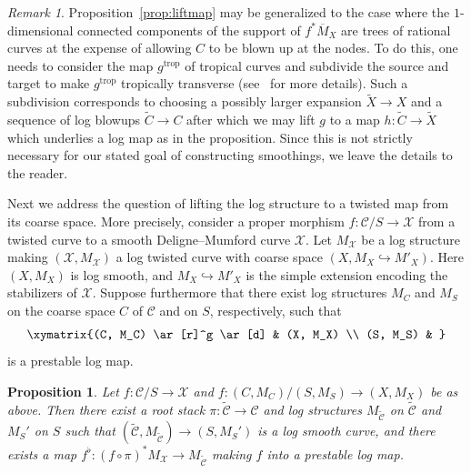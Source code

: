 \documentclass[11pt]{amsart}
\numberwithin{equation}{section}
\newtheorem{proposition}[theorem]{Proposition}
\theoremstyle{definition}
\theoremstyle{remark}
\newtheorem{remark}[theorem]{Remark}
\newcommand{\calX}{\mathcal X}
\newcommand{\calC}{\mathcal C}
\newcommand{\trop}{\mathrm{trop}}
\begin{document}
\begin{remark} \label{rem:f*M} Proposition~\ref{prop:liftmap} may be generalized to the case where the $1$-dimensional connected components of the support of $f^*\overline{M}_X$ are trees of rational curves at the expense of allowing $C$ to be blown up at the nodes. To do this, one needs to consider the map $g^{\trop}$ of tropical curves and subdivide the source and target to make $g^{\trop}$ tropically transverse (see~\cite[Sections 2.5 and 2.6]{dhruv} for more details). Such a subdivision corresponds to choosing a possibly larger expansion $\widetilde{X} \to X$ and a sequence of log blowups $\widetilde{C} \to C$ after which we may lift $g$ to a map $h \colon  \widetilde{C} \to \widetilde{X}$ which underlies a log map as in the proposition. Since this is not strictly necessary for our stated goal of constructing smoothings, we leave the details to the reader. 
\end{remark} 


Next we address the question of lifting the log structure to a twisted map from its coarse space. More precisely, consider a proper morphism $f \colon  \calC/S \to \calX$  from a twisted curve to a smooth Deligne--Mumford curve $\calX$. Let $M_\calX$ be a log structure making $(\calX, M_{\calX})$ a log twisted curve with coarse space $(X, M_X \hookrightarrow M'_X)$. Here $(X,M_X)$ is log smooth, and $M_X \hookrightarrow M'_X$ is the simple extension encoding the stabilizers of $\calX$. Suppose furthermore that there exist log structures $M_C$ and $M_S$ on the coarse space $C$ of $\calC$ and on $S$, respectively, such that
$$
\xymatrix{(C, M_C) \ar[r]^g \ar[d] & (X, M_X) \\ (S, M_S) & }
$$
is a prestable log map. 

\begin{proposition}\label{prop:rootstack} Let $f \colon  \calC/S \to \calX$ and $f \colon  (C,M_C)/(S, M_S) \to (X,M_X)$ be as above. Then there exist a root stack $\pi \colon  \tilde{\calC} \to \calC$ and log structures $M_{\tilde{\calC}}$ on $\tilde{\calC}$ and $M_S'$ on $S$ such that $(\tilde{\calC}, M_{\tilde{\calC}}) \to (S, M_S')$ is a log smooth curve, and there exists a map  $f^\flat \colon  (f \circ \pi)^*M_\calX \to M_{\tilde{\calC}}$ making $f$ into a prestable log map.   
\end{proposition} 
\end{document}
